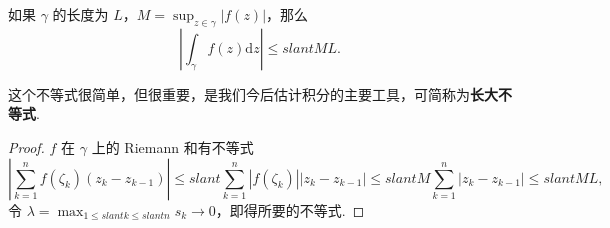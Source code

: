 \documentclass[../../main.tex]{subfiles}
\begin{document}
\begin{proposition}[长大不等式]\label{proposition:长大不等式}
如果 \( \gamma \) 的长度为 \( L \)，\( M = \sup_{z \in \gamma} |f(z)| \)，那么
\[
\left| \int_\gamma f(z)\mathrm{d}z \right| \leqslant slant ML. \tag{4}
\]
\end{proposition}
\begin{remark}
这个不等式很简单，但很重要，是我们今后估计积分的主要工具，可简称为\textbf{长大不等式}.
\end{remark}
\begin{proof}
\( f \) 在 \( \gamma \) 上的 Riemann 和有不等式
\[
\left| \sum_{k = 1}^n f(\zeta_k)(z_k - z_{k - 1}) \right| \leqslant slant \sum_{k = 1}^n |f(\zeta_k)| |z_k - z_{k - 1}|
\leqslant slant M \sum_{k = 1}^n |z_k - z_{k - 1}|
\leqslant slant ML,
\]
令 \( \lambda = \max_{1 \leqslant slant k \leqslant slant n} s_k \to 0 \)，即得所要的不等式.
\end{proof}
\end{document}

